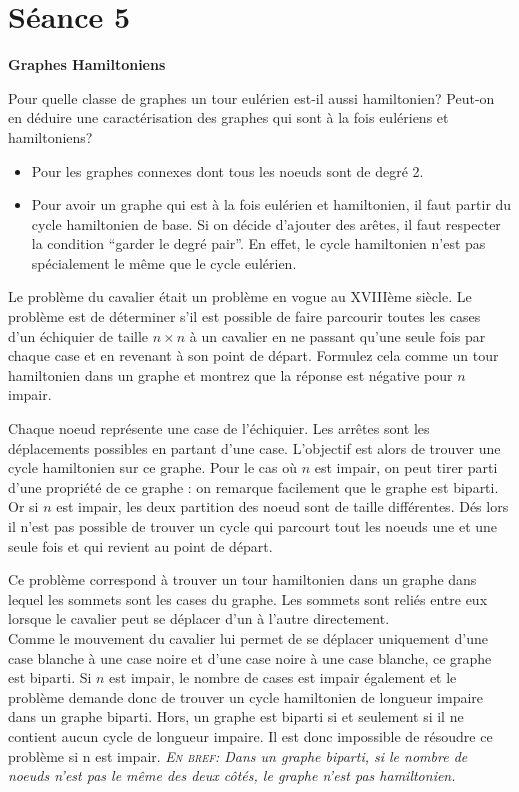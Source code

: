 \section{Séance 5}

\textbf{Graphes Hamiltoniens}

Pour quelle classe de graphes un tour eulérien est-il aussi hamiltonien? Peut-on en déduire une caractérisation des graphes qui sont à la fois eulériens et hamiltoniens?
\begin{solution}
\begin{itemize}
\item Pour les graphes connexes dont tous les noeuds sont de degré 2.
\item Pour avoir un graphe qui est à la fois eulérien et hamiltonien, il faut partir du cycle hamiltonien de base. Si on décide d'ajouter des arêtes, il faut respecter la condition ``garder le degré pair''. En effet, le cycle hamiltonien n'est pas spécialement le même que le cycle eulérien.
\end{itemize}
\end{solution}

Le problème du cavalier était un problème en vogue au XVIIIème siècle. Le problème est de déterminer s'il est possible de faire parcourir toutes les cases d'un échiquier de taille $n \times n$ à un cavalier en ne passant qu'une seule fois par chaque case et en revenant à son point de départ. Formulez cela comme un tour hamiltonien dans un graphe et montrez que la réponse est négative pour $n$ impair.
\begin{solution}
Chaque noeud représente une case de l'échiquier. Les arrêtes sont les déplacements possibles en partant d'une case. L'objectif est alors de trouver une cycle hamiltonien sur ce graphe. Pour le cas où $n$ est impair, on peut tirer parti d'une propriété de ce graphe : on remarque facilement que le graphe est biparti. Or si $n$ est impair, les deux partition des noeud sont de taille différentes. Dés lors il n'est pas possible de trouver un cycle qui parcourt tout les noeuds une et une seule fois et qui revient au point de départ.

Ce problème correspond à trouver un tour hamiltonien dans un graphe dans lequel les sommets sont les cases du graphe. Les sommets sont reliés entre eux lorsque le cavalier peut se déplacer d'un à l'autre directement.\\
Comme le mouvement du cavalier lui permet de se déplacer uniquement d'une case blanche à une case noire et d'une case noire à une case blanche, ce graphe est biparti.
Si $n$ est impair, le nombre de cases est impair également et le problème demande donc de trouver un cycle hamiltonien de longueur impaire dans un graphe biparti. Hors, un graphe est biparti si et seulement si il ne contient aucun cycle de longueur impaire. Il est donc impossible de résoudre ce problème si n est impair.
\textit{\textsc{En bref: }Dans un graphe biparti, si le nombre de noeuds n'est pas le même des deux côtés, le graphe n'est pas hamiltonien.}
\end{solution}

